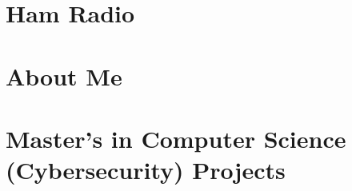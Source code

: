 \documentclass[a4paper,11pt,oneside]{book}
\begin{document}




\section{Ham Radio}









\section{About Me}













\section{Master's in Computer Science (Cybersecurity) Projects}












\end{document}
